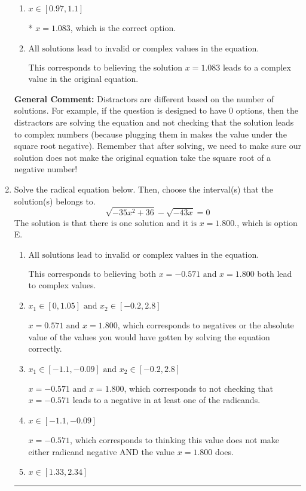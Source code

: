 \documentclass{extbook}[14pt]
\newcommand{\litem}[1]{\item #1

\rule{\textwidth}{0.4pt}}
\begin{document}
\begin{enumerate}
{\begin{enumerate}[label=\Alph*.]
$x = -0.417$, which corresponds to squaring each square root separately and assigning the negative to the third term.
\item \( x \in [0.97,1.1] \)

* $x = 1.083$, which is the correct option.
\item \( \text{All solutions lead to invalid or complex values in the equation.} \)

This corresponds to believing the solution $x = 1.083$ leads to a complex value in the original equation.
\end{enumerate}

\textbf{General Comment:} Distractors are different based on the number of solutions. For example, if the question is designed to have 0 options, then the distractors are solving the equation and not checking that the solution leads to complex numbers (because plugging them in makes the value under the square root negative). Remember that after solving, we need to make sure our solution does not make the original equation take the square root of a negative number!
}
\litem{
Solve the radical equation below. Then, choose the interval(s) that the solution(s) belongs to.
\[ \sqrt{-35 x^2 + 36} - \sqrt{-43 x} = 0 \]The solution is \( \text{that there is one solution and it is } x = 1.800. \), which is option E.\begin{enumerate}[label=\Alph*.]
\item \( \text{All solutions lead to invalid or complex values in the equation.} \)

This corresponds to believing both $x = -0.571 \text{ and } x = 1.800$ both lead to complex values.
\item \( x_1 \in [0, 1.05] \text{ and } x_2 \in [-0.2,2.8] \)

$x = 0.571 \text{ and } x = 1.800$, which corresponds to negatives or the absolute value of the values you would have gotten by solving the equation correctly.
\item \( x_1 \in [-1.1, -0.09] \text{ and } x_2 \in [-0.2,2.8] \)

$x = -0.571 \text{ and } x = 1.800$, which corresponds to not checking that $x = -0.571$ leads to a negative in at least one of the radicands.
\item \( x \in [-1.1,-0.09] \)

$x = -0.571$, which corresponds to thinking this value does not make either radicand negative AND the value $x = 1.800$ does.
\item \( x \in [1.33,2.34] \)


\end{enumerate}}
\end{enumerate}
\end{document}

